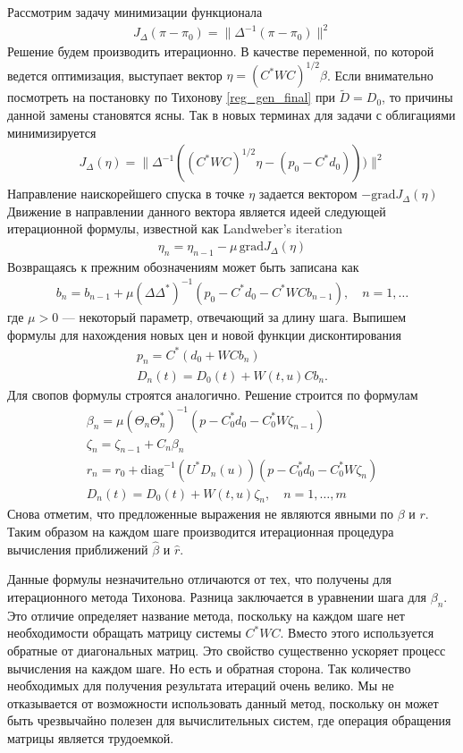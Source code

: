 \documentclass[10pt]{article}
\theoremstyle{definition}
\theoremstyle{remark}
\theoremstyle{plain}
\newcommand{\wt}{\widetilde}
\newcommand{\diag}{\mathrm{diag}}
\begin{document}
\begin{itemize}
Рассмотрим задачу минимизации функционала
\begin{align}
J_\Delta(\pi-\pi_0) = \|\Delta^{-1}(\pi-\pi_0)\|^2
\end{align}
Решение будем производить итерационно. В качестве переменной, по которой ведется оптимизация, выступает вектор $\eta = (C^*WC)^{1/2}\beta$. Если внимательно посмотреть на постановку по Тихонову \eqref{reg_gen_final} при $\wt{D} = D_0$, то причины данной замены становятся ясны. Так в новых терминах для задачи с облигациями минимизируется 
\begin{align}
J_\Delta(\eta) = \|\Delta^{-1}((C^*WC)^{1/2}\eta - (p_0 - C^*d_0)))\|^2
\end{align}
Направление наискорейшего спуска в точке $\eta$ задается вектором
$
-\mathrm{grad} J_\Delta(\eta) 
$
Движение в направлении данного вектора является идеей следующей итерационной формулы, известной как Landweber's iteration
\begin{align}
\eta_{n} = \eta_{n-1} - \mu \,\mathrm{grad} J_\Delta(\eta)
\end{align}
Возвращаясь к прежним обозначениям  может быть записана как
\begin{align}
b_n = b_{n-1} + \mu (\Delta\Delta^*)^{-1}(p_0-C^*d_0 - C^*WCb_{n-1}), \quad n=1,\ldots
\end{align}
где $\mu>0$ --- некоторый параметр, отвечающий за длину шага. Выпишем формулы для нахождения новых цен и новой функции дисконтирования 
\begin{gather*}
p_n = C^*(d_0 + WCb_n)\\
D_n(t) = D_0(t) + W(t,u)C b_n.
\end{gather*}
Для свопов формулы строятся аналогично. Решение строится по формулам
\begin{gather*}
\beta_n = \mu(\Theta_{n}\Theta_{n}^*)^{-1}\left(p - C_0^*d_0 - C_0^*W\zeta_{n-1}\right) 
\\
\zeta_n = \zeta_{n-1}+ C_n\beta_n
\\
r_n = r_0 + \diag^{-1}(U^*D_n(u))\left(p - C_0^*d_0 - C_0^*W\zeta_n\right)
\\
D_n(t) = D_0(t) + W(t,u)\zeta_n  ,\quad n=1,\ldots, m 
\end{gather*}
Снова отметим, что предложенные выражения не являются явными по $\beta$ и $r$. Таким образом на каждом шаге производится итерационная процедура вычисления приближений $\hat{\beta}$ и $\hat{r}$.

Данные формулы незначительно отличаются от тех, что получены для итерационного метода Тихонова. Разница заключается в уравнении шага для $\beta_n$. Это отличие определяет название метода, поскольку на каждом шаге нет необходимости обращать матрицу системы $C^*WC$. Вместо этого используется обратные от диагональных матриц. Это свойство существенно ускоряет процесс вычисления на каждом шаге. Но есть и обратная сторона. Так количество необходимых для получения результата итераций очень велико. Мы не отказывается от возможности использовать данный метод, поскольку он может быть чрезвычайно полезен для вычислительных систем, где операция обращения матрицы является трудоемкой.


\end{itemize}
\end{document}
